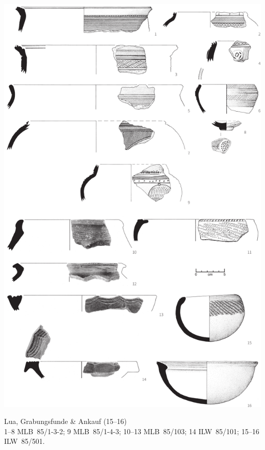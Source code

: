 \begin{pl}[H]
	\includegraphics{plt/Taf27.pdf}
	\vspace{.75em}\caption{Lua, Grabungsfunde \& Ankauf (15--16) \\ 1--8 MLB~85/1-3-2; 9 MLB~85/1-4-3; 10--13 MLB~85/103; 14 ILW~85/101; 15--16 ILW~85/501.}
	\label{pl:27}
\end{pl}

